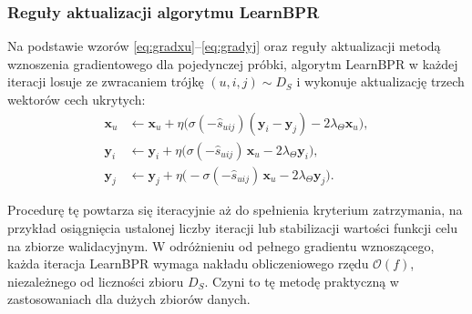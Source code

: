 \subsubsection{Reguły aktualizacji algorytmu LearnBPR}

Na podstawie wzorów \eqref{eq:gradxu}--\eqref{eq:gradyj} oraz reguły aktualizacji metodą wznoszenia gradientowego dla pojedynczej próbki, algorytm LearnBPR w każdej iteracji losuje ze zwracaniem trójkę $(u,i,j) \sim D_S$ i wykonuje aktualizację trzech wektorów cech ukrytych:
\begin{align}
    \mathbf{x}_u &\leftarrow \mathbf{x}_u + \eta \Big( \sigma(-\hat{s}_{uij})(\mathbf{y}_i - \mathbf{y}_j) - 2\lambda_\Theta \mathbf{x}_u \Big), \\
    \mathbf{y}_i &\leftarrow \mathbf{y}_i + \eta \Big( \sigma(-\hat{s}_{uij})\,\mathbf{x}_u - 2\lambda_\Theta \mathbf{y}_i \Big), \\
    \mathbf{y}_j &\leftarrow \mathbf{y}_j + \eta \Big( -\sigma(-\hat{s}_{uij})\,\mathbf{x}_u - 2\lambda_\Theta \mathbf{y}_j \Big).
\end{align}

Procedurę tę powtarza się iteracyjnie aż do spełnienia kryterium zatrzymania, na przykład osiągnięcia ustalonej liczby iteracji lub stabilizacji wartości funkcji celu na zbiorze walidacyjnym. W odróżnieniu od pełnego gradientu wznoszącego, każda iteracja LearnBPR wymaga nakładu obliczeniowego rzędu $\mathcal{O}(f)$, niezależnego od liczności zbioru $D_S$. Czyni to tę metodę praktyczną w zastosowaniach dla dużych zbiorów danych.